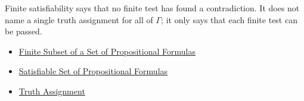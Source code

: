 \begin{remark*}[Interpretation]
Finite satisfiability says that no finite test has found a contradiction. It
does not name a single truth assignment for all of \(\Gamma\); it only says
that each finite test can be passed.
\end{remark*}

\begin{dependencies}
\begin{itemize}
  \item \hyperref[def:finite-subset-of-set-of-propositional-formulas]{Finite Subset of a Set of Propositional Formulas}
  \item \hyperref[def:satisfiable-set-of-propositional-formulas]{Satisfiable Set of Propositional Formulas}
  \item \hyperref[def:truth-assignment-propositional-logic]{Truth Assignment}
\end{itemize}
\end{dependencies}
